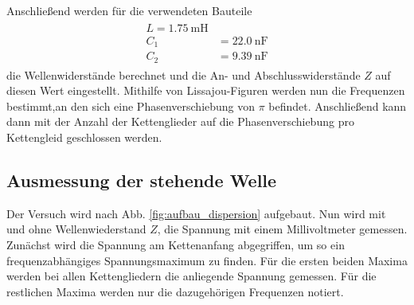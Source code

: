 Anschließend werden für die verwendeten Bauteile
\begin{align}
\begin{aligned}
  L=\SI{1,75}{\milli\henry}\\
  C_1&=\SI{22,0}{\nano\farad}\\
  C_2&=\SI{9,39}{\nano\farad}
\end{aligned}
\end{align}
die Wellenwiderstände berechnet %
und die An- und Abschlusswiderstände $Z$ auf diesen Wert eingestellt.
Mithilfe von Lissajou-Figuren werden nun die Frequenzen bestimmt,an den sich eine Phasenverschiebung von $\pi$ %
befindet. Anschließend kann dann mit der Anzahl der Kettenglieder auf die %
Phasenverschiebung pro Kettengleid geschlossen werden.

\subsection{Ausmessung der stehende Welle}
Der Versuch wird nach Abb. \ref{fig:aufbau_dispersion} aufgebaut.
Nun wird mit und ohne Wellenwiederstand $Z$, die Spannung mit einem Millivoltmeter gemessen. %
Zunächst wird die Spannung am Kettenanfang abgegriffen, um so ein frequenzabhängiges Spannungsmaximum
zu finden. Für die ersten beiden Maxima werden bei allen Kettengliedern die anliegende Spannung gemessen. %
Für die restlichen Maxima werden nur die dazugehörigen Frequenzen notiert.
